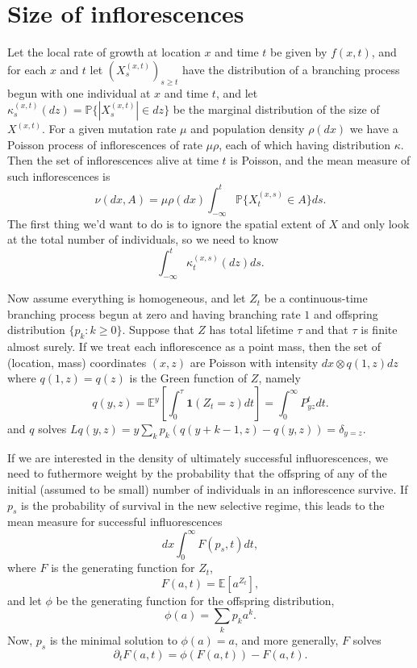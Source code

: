 \documentclass{article}
\renewcommand{\P}{\mathbb{P}}
\newcommand{\E}{\mathbb{E}}
\newcommand{\one}{\mathbf{1}}
\begin{document}
\section{Size of inflorescences}

Let the local rate of growth at location $x$ and time $t$ be given by $f(x,t)$,
and for each $x$ and $t$ let $(X^{(x,t)}_{s})_{s \ge t}$ have the distribution of a branching process begun with one individual at $x$ and time $t$,
and let $\kappa^{(x,t)}_s(dz) = \P\{ |X^{(x,t)}_s| \in dz \}$  be the marginal distribution of the size of $X^{(x,t)}$.
For a given mutation rate $\mu$ and population density $\rho(dx)$ we have a Poisson process of inflorescences of rate $\mu \rho$,
each of which having distribution $\kappa$.  
Then the set of inflorescences alive at time $t$ is Poisson, 
and the mean measure of such inflorescences is
\[ \nu(dx,A) = \mu \rho(dx) \int_{-\infty}^t \P\{ X^{(x,s)}_t \in A \} ds .\]
The first thing we'd want to do is to ignore the spatial extent of $X$ and only look at the total number of individuals,
so we need to know
\[ \int_{-\infty}^t \kappa^{(x,s)}_t(dz) ds . \]

Now assume everything is homogeneous, and let $Z_t$ be a continuous-time branching process begun at zero 
and having branching rate $1$ and offspring distribution $\{p_k : k\ge 0\}$.
Suppose that $Z$ has total lifetime $\tau$ and that $\tau$ is finite almost surely.
If we treat each inflorescence as a point mass, then the set of (location, mass) coordinates $(x,z)$
are Poisson with intensity $dx \otimes q(1,z) dz$ where $q(1,z)=q(z)$ is the Green function of $Z$, namely
\[  
  q(y,z) = \E^y \left[ \int_0^\tau \one(Z_t = z) dt \right] = \int_0^\infty P^t_{yz} dt .
\]
and $q$ solves $L q(y,z) = y \sum_k p_k (q(y+k-1,z)-q(y,z)) = \delta_{y=z}$.

If we are interested in the density of ultimately successful influorescences,
we need to futhermore weight by the probability that the offspring of any of the initial (assumed to be small) number of individuals in an inflorescence survive.
If $p_s$ is the probability of survival in the new selective regime,
this leads to the mean measure for successful influorescences
\[
   dx \int_0^\infty F(p_s,t) dt ,
\]
where $F$ is the generating function for $Z_t$,
\[
  F(a,t) = \E[a^{Z_t}] ,
\]
and let $\phi$ be the generating function for the offspring distribution,
\[
  \phi(a) = \sum_k p_k a^k .
\]
Now, $p_s$ is the minimal solution to $\phi(a) = a$,
and more generally, $F$ solves
\[
   \partial_t F(a,t) = \phi(F(a,t)) - F(a,t).
\]
\end{document}
